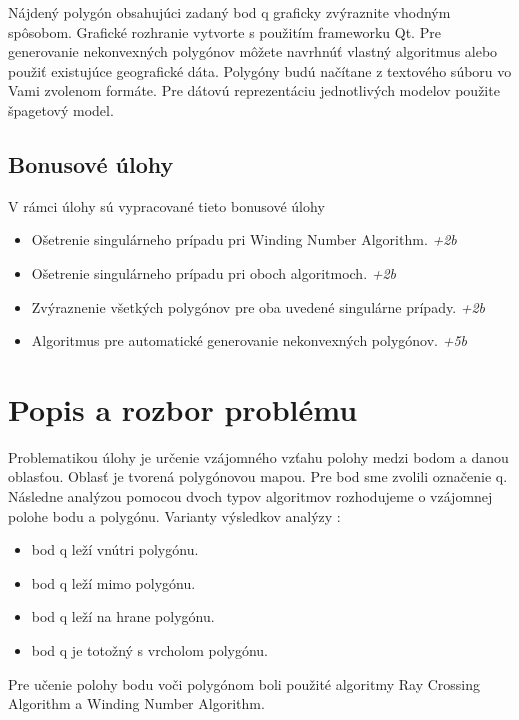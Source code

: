 \documentclass[12pt]{article}
\begin{document}
Nájdený polygón obsahujúci zadaný bod q graficky zvýraznite vhodným spôsobom. Grafické rozhranie vytvorte s použitím frameworku Qt. Pre generovanie nekonvexných polygónov môžete navrhnúť vlastný algoritmus alebo použiť existujúce geografické dáta. Polygóny budú načítane z textového súboru vo Vami zvolenom formáte. Pre dátovú reprezentáciu jednotlivých modelov použite špagetový model.

\subsection{Bonusové úlohy}
V rámci úlohy sú vypracované tieto bonusové úlohy

\begin{itemize}
\item Ošetrenie singulárneho prípadu pri Winding Number Algorithm. \textit{+2b}
\item Ošetrenie singulárneho prípadu pri oboch algoritmoch. \textit{+2b}
\item Zvýraznenie všetkých polygónov pre oba uvedené singulárne prípady. \textit{+2b}
\item Algoritmus pre automatické generovanie nekonvexných polygónov. \textit{+5b}
\end{itemize}

\section{Popis a rozbor problému}
 Problematikou úlohy je určenie vzájomného vzťahu polohy medzi bodom a danou oblasťou. Oblasť je tvorená polygónovou mapou. Pre bod sme zvolili označenie q. Následne analýzou pomocou dvoch typov algoritmov rozhodujeme o vzájomnej polohe bodu a polygónu.
Varianty výsledkov analýzy :

\begin{itemize}
\item bod q leží vnútri polygónu.
\item bod q leží mimo polygónu.
\item bod q leží na hrane polygónu.
\item bod q je totožný s vrcholom polygónu.
\end{itemize}

Pre učenie polohy bodu voči polygónom boli použité algoritmy Ray Crossing Algorithm a Winding Number Algorithm.
\end{document}
